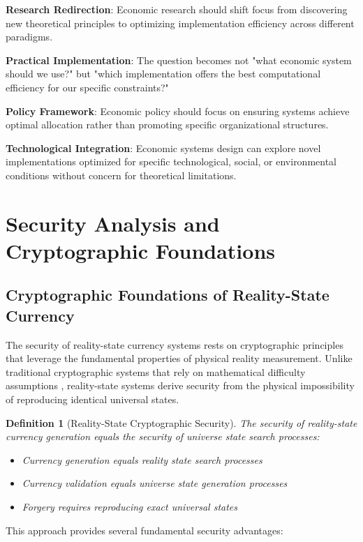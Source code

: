\documentclass[12pt,a4paper]{article}
\newtheorem{definition}[theorem]{Definition}
\begin{document}
\textbf{Research Redirection}: Economic research should shift focus from discovering new theoretical principles to optimizing implementation efficiency across different paradigms.

\textbf{Practical Implementation}: The question becomes not "what economic system should we use?" but "which implementation offers the best computational efficiency for our specific constraints?"

\textbf{Policy Framework}: Economic policy should focus on ensuring systems achieve optimal allocation rather than promoting specific organizational structures.

\textbf{Technological Integration}: Economic systems design can explore novel implementations optimized for specific technological, social, or environmental conditions without concern for theoretical limitations.

\section{Security Analysis and Cryptographic Foundations}

\subsection{Cryptographic Foundations of Reality-State Currency}

The security of reality-state currency systems rests on cryptographic principles that leverage the fundamental properties of physical reality measurement. Unlike traditional cryptographic systems that rely on mathematical difficulty assumptions \cite{rsa1978,diffie1976}, reality-state systems derive security from the physical impossibility of reproducing identical universal states.

\begin{definition}[Reality-State Cryptographic Security]
The security of reality-state currency generation equals the security of universe state search processes:
\begin{itemize}
\item Currency generation equals reality state search processes
\item Currency validation equals universe state generation processes
\item Forgery requires reproducing exact universal states
\end{itemize}
\end{definition}

This approach provides several fundamental security advantages:
\end{document}
